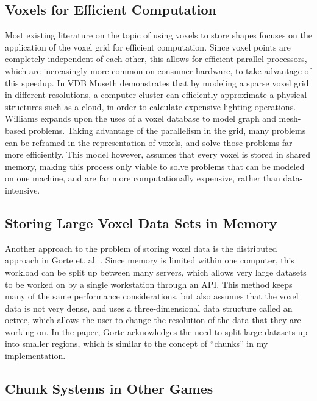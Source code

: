 \documentclass[10pt,twocolumn]{article}
\begin{document}
\subsection{Voxels for Efficient Computation}

Most existing literature on the topic of using voxels to store shapes focuses on
the application of the voxel grid for efficient computation. Since voxel points
are completely independent of each other, this allows for efficient parallel
processors, which are increasingly more common on consumer hardware, to take
advantage of this speedup. In VDB\cite{museth2013vdb} Museth demonstrates that
by modeling a sparse voxel grid in different resolutions, a computer cluster can
efficiently approximate a physical structures such as a cloud, in order to
calculate expensive lighting operations.
Williams\cite{williams1992voxel} expands upon the uses of a voxel database to
model graph and mesh-based problems. Taking advantage of the parallelism in the
grid, many problems can be reframed in the representation of voxels, and solve
those problems far more efficiently. This model however, assumes that every
voxel is stored in shared memory, making this process only viable to solve
problems that can be modeled on one machine, and are far more computationally
expensive, rather than data-intensive.

\subsection{Storing Large Voxel Data Sets in Memory}

Another approach to the problem of storing voxel data is the distributed
approach in Gorte et. al. \cite{gorte2023analysis}. Since memory is limited
within one computer, this workload can be split up between many servers, which
allows very large datasets to be worked on by a single workstation through an
API. This method keeps many of the same performance considerations, but also
assumes that the voxel data is not very dense, and uses a three-dimensional
data structure called an octree, which allows the user to change the resolution
of the data that they are working on. In the paper, Gorte acknowledges the need
to split large datasets up into smaller regions, which is similar to the concept
of ``chunks'' in my implementation.

\subsection{Chunk Systems in Other Games}
\end{document}
